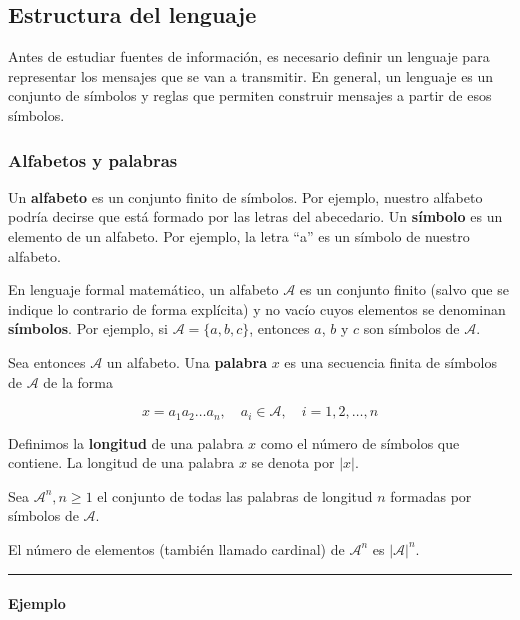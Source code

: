 \subsection{Estructura del lenguaje}\label{estructura-del-lenguaje}

Antes de estudiar fuentes de información, es necesario definir un
lenguaje para representar los mensajes que se van a transmitir. En
general, un lenguaje es un conjunto de símbolos y reglas que permiten
construir mensajes a partir de esos símbolos.

\subsubsection{Alfabetos y palabras}\label{alfabetos-y-palabras}

Un \textbf{alfabeto} es un conjunto finito de símbolos. Por ejemplo,
nuestro alfabeto podría decirse que está formado por las letras del
abecedario. Un \textbf{símbolo} es un elemento de un alfabeto. Por
ejemplo, la letra ``a'' es un símbolo de nuestro alfabeto.

En lenguaje formal matemático, un alfabeto \(\mathcal{A}\) es un
conjunto finito (salvo que se indique lo contrario de forma explícita) y
no vacío cuyos elementos se denominan \textbf{símbolos}. Por ejemplo, si
\(\mathcal{A} = \{a, b, c\}\), entonces \(a\), \(b\) y \(c\) son
símbolos de \(\mathcal{A}\).

Sea entonces \(\mathcal{A}\) un alfabeto. Una \textbf{palabra} \(x\) es
una secuencia finita de símbolos de \(\mathcal{A}\) de la forma

\[
x=a_1a_2\dots a_n, \quad a_i \in \mathcal{A}, \quad i=1,2,\dots,n
\]

Definimos la \textbf{longitud} de una palabra \(x\) como el número de
símbolos que contiene. La longitud de una palabra \(x\) se denota por
\(|x|\).

Sea \(\mathcal{A}^n,n\geq 1\) el conjunto de todas las palabras de
longitud \(n\) formadas por símbolos de \(\mathcal{A}\).

El número de elementos (también llamado cardinal) de \(\mathcal{A}^n\)
es \(|\mathcal{A}|^n\).

\begin{center}\rule{0.5\linewidth}{0.5pt}\end{center}

\paragraph{Ejemplo}\label{ejemplo}

